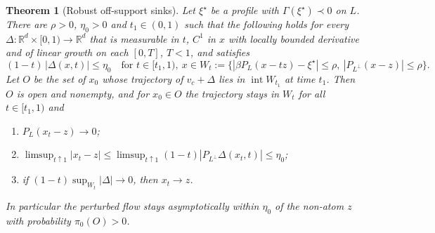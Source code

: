 \documentclass[11pt]{article}
\newtheorem{theorem}{Theorem}
\theoremstyle{definition}
\theoremstyle{remark}
\newcommand{\R}{\mathbb R}
\begin{document}
\begin{theorem}[Robust off-support sinks]\label{thm:robust-sink}
Let $\xi^\star$ be a profile with $\Gamma(\xi^\star)\prec0$ on $L$. There are $\rho>0$, $\eta_0>0$ and
$t_1\in(0,1)$ such that the following holds for every $\Delta:\R^d\times[0,1)\to\R^d$ that is measurable
in $t$, $C^1$ in $x$ with locally bounded derivative and of linear growth on each $[0,T]$, $T<1$, and
satisfies
\[
(1-t)\,|\Delta(x,t)|\le\eta_0\quad\text{for }t\in[t_1,1),\ x\in W_t:=\{|\beta P_L(x-tz)-\xi^\star|\le\rho,\
|P_{L^\perp}(x-z)|\le\rho\}.
\]
Let $O$ be the set of $x_0$ whose trajectory of $v_c+\Delta$ lies in $\operatorname{int}W_{t_1}$ at
time $t_1$. Then $O$ is open and nonempty, and for $x_0\in O$ the trajectory stays in $W_t$ for all
$t\in[t_1,1)$ and
\begin{enumerate}[label=(\roman*),leftmargin=2em]
\item $P_L(x_t-z)\to0$;
\item $\limsup_{t\uparrow1}|x_t-z|\le\limsup_{t\uparrow1}(1-t)|P_{L^\perp}\Delta(x_t,t)|\le\eta_0$;
\item if $(1-t)\sup_{W_t}|\Delta|\to0$, then $x_t\to z$.
\end{enumerate}
In particular the perturbed flow stays asymptotically within $\eta_0$ of the non-atom $z$ with
probability $\pi_0(O)>0$.
\end{theorem}
\end{document}
